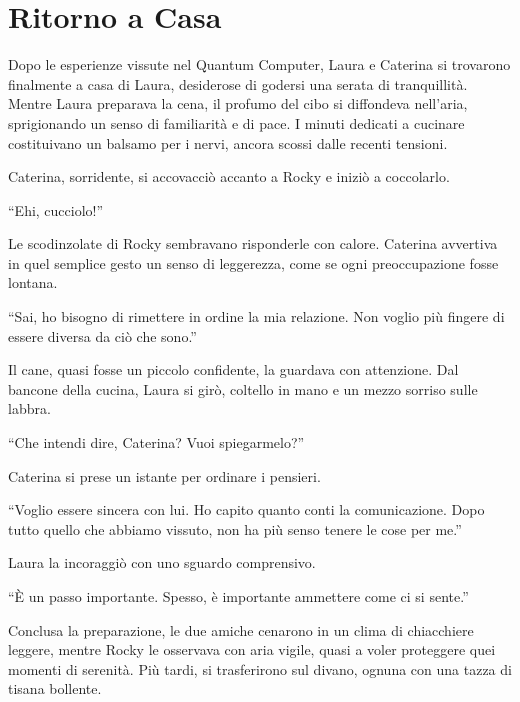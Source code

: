 \section{Ritorno a Casa}

Dopo le esperienze vissute nel Quantum Computer, Laura e Caterina si trovarono finalmente a casa di Laura, desiderose di godersi una serata di tranquillità. Mentre Laura preparava la cena, il profumo del cibo si diffondeva nell’aria, sprigionando un senso di familiarità e di pace. I minuti dedicati a cucinare costituivano un balsamo per i nervi, ancora scossi dalle recenti tensioni.

Caterina, sorridente, si accovacciò accanto a Rocky e iniziò a coccolarlo. 
\begin{dialogue}
 \enquote{Ehi, cucciolo!}
\end{dialogue}
Le scodinzolate di Rocky sembravano risponderle con calore. Caterina avvertiva in quel semplice gesto un senso di leggerezza, come se ogni preoccupazione fosse lontana.

\begin{dialogue}
 \enquote{Sai, ho bisogno di rimettere in ordine la mia relazione. Non voglio più fingere di essere diversa da ciò che sono.}
\end{dialogue}

Il cane, quasi fosse un piccolo confidente, la guardava con attenzione. Dal bancone della cucina, Laura si girò, coltello in mano e un mezzo sorriso sulle labbra.

\begin{dialogue}
 \enquote{Che intendi dire, Caterina? Vuoi spiegarmelo?}
\end{dialogue}

Caterina si prese un istante per ordinare i pensieri.
\begin{dialogue}
 \enquote{Voglio essere sincera con lui. Ho capito quanto conti la comunicazione. Dopo tutto quello che abbiamo vissuto, non ha più senso tenere le cose per me.}
\end{dialogue}

Laura la incoraggiò con uno sguardo comprensivo.
\begin{dialogue}
 \enquote{È un passo importante. Spesso, è importante ammettere come ci si sente.}
\end{dialogue}

Conclusa la preparazione, le due amiche cenarono in un clima di chiacchiere leggere, mentre Rocky le osservava con aria vigile, quasi a voler proteggere quei momenti di serenità. Più tardi, si trasferirono sul divano, ognuna con una tazza di tisana bollente.

